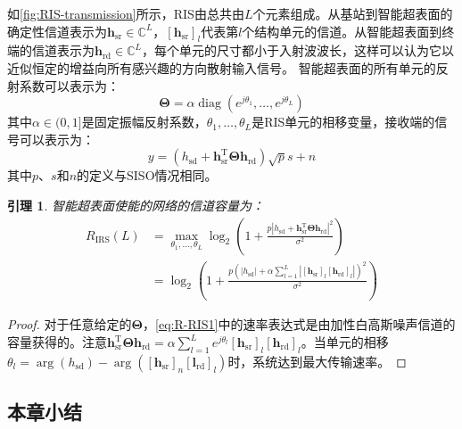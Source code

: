 \documentclass[supercite]{HustGraduPaper}
\newtheorem{lemma}{\indent 引理}[section]
\begin{document}
如\autoref{fig:RIS-transmission}所示，RIS由总共由$L$个元素组成。从基站到智能超表面的确定性信道表示为$\mathbf{h}_{\mathrm{sr}} \in \mathbb{C}^{L}$，$\left[\mathbf{h}_{\mathrm{sr}}\right]_{l}$代表第$l$个结构单元的信道。从智能超表面到终端的信道表示为$\mathbf{h}_{\mathrm{rd}} \in \mathbb{C}^{L}$，每个单元的尺寸都小于入射波波长，这样可以认为它以近似恒定的增益向所有感兴趣的方向散射输入信号\cite{emil2019intelligent}。
智能超表面的所有单元的反射系数可以表示为：
\begin{equation}
	\boldsymbol{\Theta}=\alpha \operatorname{diag}\left(e^{j \theta_{1}}, \ldots, e^{j \theta_{L}}\right)
\end{equation}
其中$\alpha \in (0,1]$是固定振幅反射系数，$\theta_{1}, \ldots, \theta_{L}$是RIS单元的相移变量，接收端的信号可以表示为：
\begin{equation}
	y=\left(h_{\mathrm{sd}}+\mathbf{h}_{\mathrm{sr}}^{\mathrm{T}} \boldsymbol{\Theta} \mathbf{h}_{\mathrm{rd}}\right) \sqrt{p} s+n
\end{equation}
其中$p$、$s$和$n$的定义与SISO情况相同。

\begin{lemma}
	智能超表面使能的网络的信道容量为：
	\begin{align}
		R_{\mathrm{IRS}}(L) &=\max _{\theta_{1}, \ldots, \theta_{L}} \log _{2}\left(1+\frac{p\left|h_{\mathrm{sd}}+\mathbf{h}_{\mathrm{sr}}^{\mathrm{T}} \boldsymbol{\Theta} \mathbf{h}_{\mathrm{rd}}\right|^{2}}{\sigma^{2}}\right) \label{eq:R-RIS1} \\
		&=\log _{2}\left(1+\frac{p\left(\left|h_{\mathrm{sd}}\right|+\alpha \sum_{l=1}^{L}\left|\left[\mathbf{h}_{\mathrm{sr}}\right]_{l}\left[\mathbf{h}_{\mathrm{rd}}\right]_{l}\right|\right)^{2}}{\sigma^{2}}\right)
	\end{align}
\end{lemma}

\begin{proof}
	对于任意给定的$\boldsymbol{\Theta}$，\autoref{eq:R-RIS1}中的速率表达式是由加性白高斯噪声信道的容量获得的。注意$ \mathbf{h}_{\mathrm{sr}}^{\mathrm{T}} \boldsymbol{\Theta} \mathbf{h}_{\mathrm{rd}} = \alpha \sum_{l=1}^{L} e^{j\theta_l} \left[\mathbf{h}_{\mathrm{sr}}\right]_{l}\left[\mathbf{h}_{\mathrm{rd}}\right]_{l} $。当单元的相移$\theta_{l}=\arg \left(h_{\mathrm{sd}}\right)-\arg \left(\left[\mathbf{h}_{\mathrm{sr}}\right]_{n}\left[\mathbf{l}_{\mathrm{rd}}\right]_{l}\right)$时，系统达到最大传输速率。
\end{proof}

\subsection{本章小结}
\end{document}
